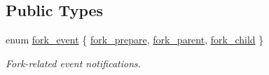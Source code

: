 \subsection*{Public Types}
\begin{DoxyCompactItemize}
\item 
enum \hyperlink{classasio_1_1io__service_a45f084ae64e601f7ead3f891d5ed0fc6}{fork\+\_\+event} \{ \hyperlink{classasio_1_1io__service_a45f084ae64e601f7ead3f891d5ed0fc6a4155066cb5e3e7d9bd8f76581168e052}{fork\+\_\+prepare}, 
\hyperlink{classasio_1_1io__service_a45f084ae64e601f7ead3f891d5ed0fc6a8c78c0331f35f99f5e86e180bce88374}{fork\+\_\+parent}, 
\hyperlink{classasio_1_1io__service_a45f084ae64e601f7ead3f891d5ed0fc6a9d080c1e5e29bac7d4f6b9cfe875f031}{fork\+\_\+child}
 \}\begin{DoxyCompactList}\small\item\em Fork-\/related event notifications. \end{DoxyCompactList}
\end{DoxyCompactItemize}
